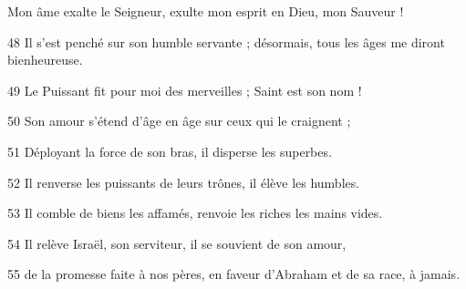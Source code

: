 Mon âme exalte le Seigneur,
exulte mon esprit en Dieu, mon Sauveur !

48 Il s'est penché sur son humble servante ;
désormais, tous les âges me diront bienheureuse.

49 Le Puissant fit pour moi des merveilles ;
Saint est son nom !

50 Son amour s'étend d'âge en âge
sur ceux qui le craignent ;

51 Déployant la force de son bras,
il disperse les superbes.

52 Il renverse les puissants de leurs trônes,
il élève les humbles.

53 Il comble de biens les affamés,
renvoie les riches les mains vides.

54 Il relève Israël, son serviteur,
il se souvient de son amour,

55 de la promesse faite à nos pères,
en faveur d'Abraham et de sa race, à jamais.
